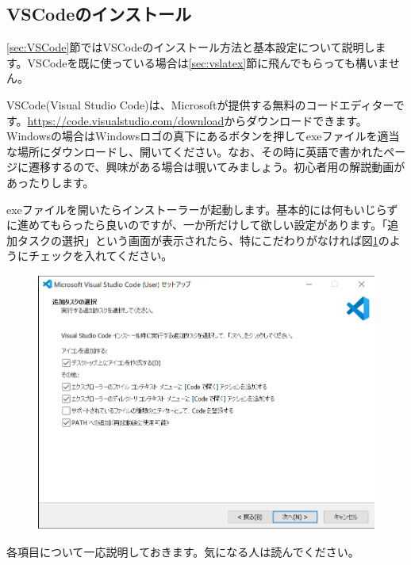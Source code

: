 \subsection{VSCodeのインストール}\label{sec:vsinstall}
\ref{sec:VSCode}節ではVSCodeのインストール方法と基本設定について説明します。VSCodeを既に使っている場合は\ref{sec:vslatex}節に飛んでもらっても構いません。

VSCode(Visual Studio Code)は、Microsoftが提供する無料のコードエディターです。\url{https://code.visualstudio.com/download}からダウンロードできます。Windowsの場合はWindowsロゴの真下にあるボタンを押してexeファイルを適当な場所にダウンロードし、開いてください。なお、その時に英語で書かれたページに遷移するので、興味がある場合は覗いてみましょう。初心者用の解説動画があったりします。

exeファイルを開いたらインストーラーが起動します。基本的には何もいじらずに進めてもらったら良いのですが、一か所だけして欲しい設定があります。「追加タスクの選択」という画面が表示されたら、特にこだわりがなければ図\ref{fig:vssetup}のようにチェックを入れてください。
\begin{figure}[H]
    \centering
    \includegraphics[height=85mm]{img/vscodesetup.png}
    \caption{}
    \label{fig:vssetup}
\end{figure}
各項目について一応説明しておきます。気になる人は読んでください。
